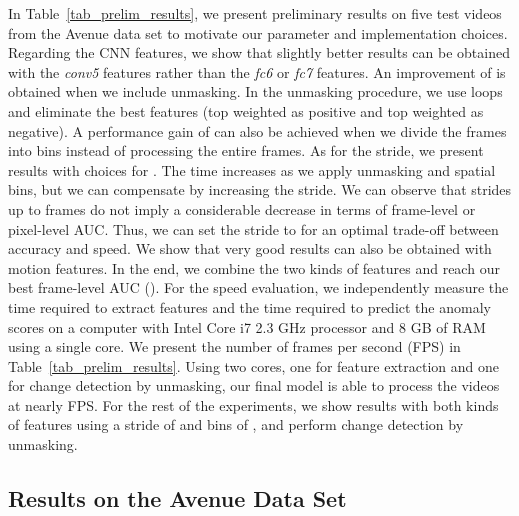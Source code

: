 \documentclass[10pt,twocolumn,letterpaper]{article}
\begin{document}
In Table~\ref{tab_prelim_results}, we present preliminary results on five test videos from the Avenue data set to motivate our parameter and implementation choices. Regarding the CNN features, we show that slightly better results can be obtained with the \emph{conv5} features rather than the \emph{fc6} or \emph{fc7} features. An improvement of  is obtained when we include unmasking. In the unmasking procedure, we use  loops and eliminate the best  features (top  weighted as positive and top  weighted as negative). A performance gain of  can also be achieved when we divide the frames into  bins instead of processing the entire frames. As for the stride, we present results with choices for . The time increases as we apply unmasking and spatial bins, but we can compensate by increasing the stride. We can observe that strides up to  frames do not imply a considerable decrease in terms of frame-level or pixel-level AUC. Thus, we can set the stride to  for an optimal trade-off between accuracy and speed. We show that very good results can also be obtained with motion features. In the end, we combine the two kinds of features and reach our best frame-level AUC (). For the speed evaluation, we independently measure the time required to extract features and the time required to predict the anomaly scores on a computer with Intel Core i7 2.3 GHz processor and 8 GB of RAM using a single core. We present the number of frames per second (FPS) in Table~\ref{tab_prelim_results}. Using two cores, one for feature extraction and one for change detection by unmasking, our final model is able to process the videos at nearly  FPS. For the rest of the experiments, we show results with both kinds of features using a stride of  and bins of , and perform change detection by unmasking.

\subsection{Results on the Avenue Data Set}
\end{document}
